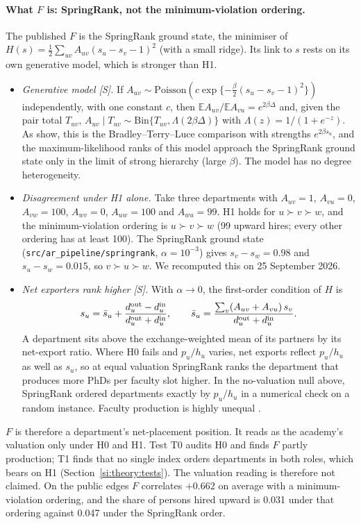 \documentclass[11pt]{article}
\begin{document}
\paragraph{What $F$ is: SpringRank, not the minimum-violation ordering.} The published $F$ is the SpringRank
ground state, the minimiser of $H(s)=\tfrac12\sum_{uv}A_{uv}(s_u-s_v-1)^2$ (with a small ridge). Its link to $s$
rests on its own generative model, which is stronger than H1.
\begin{itemize}
\item \emph{Generative model [S].} If $A_{uv}\sim\mathrm{Poisson}(c\exp\{-\tfrac{\beta}{2}(s_u-s_v-1)^2\})$
independently, with one constant $c$, then $\mathbb E A_{uv}/\mathbb E A_{vu}=e^{2\beta\Delta}$ and, given the
pair total $T_{uv}$, $A_{uv}\mid T_{uv}\sim\mathrm{Bin}\{T_{uv},\Lambda(2\beta\Delta)\}$ with
$\Lambda(z)=1/(1+e^{-z})$. As \citet{debacco2018physical} show, this is the Bradley--Terry--Luce comparison
\citep{bradley1952rank} with strengths $e^{2\beta s_u}$, and the maximum-likelihood ranks of this model approach
the SpringRank ground state only in the limit of strong hierarchy (large $\beta$). The model has no degree
heterogeneity.
\item \emph{Disagreement under H1 alone.} Take three departments with $A_{uv}=1$, $A_{vu}=0$, $A_{vw}=100$,
$A_{wv}=0$, $A_{uw}=100$ and $A_{wu}=99$. H1 holds for $u\succ v\succ w$, and the minimum-violation ordering is
$u\succ v\succ w$ (99 upward hires; every other ordering has at least 100). The SpringRank ground state
(\texttt{src/ar\_pipeline/springrank}, $\alpha=10^{-3}$) gives $s_v-s_w=0.98$ and $s_u-s_w=0.015$, so $v\succ
u\succ w$. We recomputed this on 25 September 2026.
\item \emph{Net exporters rank higher [S].} With $\alpha\to0$, the first-order condition of $H$ is
\[
s_u=\bar s_u+\frac{d^{\rm out}_u-d^{\rm in}_u}{d^{\rm out}_u+d^{\rm in}_u},\qquad
\bar s_u=\frac{\sum_v(A_{uv}+A_{vu})\,s_v}{d^{\rm out}_u+d^{\rm in}_u}.
\]
A department sits above the exchange-weighted mean of its partners by its net-export ratio. Where H0 fails and
$p_u/h_u$ varies, net exports reflect $p_u/h_u$ as well as $s_u$, so at equal valuation SpringRank ranks the
department that produces more PhDs per faculty slot higher. In the no-valuation null above, SpringRank
ordered departments exactly by $p_u/h_u$ in a numerical check on a random instance. Faculty production is highly
unequal \citep{wapman2022quantifying}.
\end{itemize}
$F$ is therefore a department's net-placement position. It reads as the academy's valuation only under H0 and H1.
Test T0 audits H0 and finds $F$ partly production; T1 finds that no single index orders departments in both roles,
which bears on H1 (Section~\ref{si:theory:tests}). The valuation reading is therefore not claimed. On the public
edges $F$ correlates
$+0.662$ on average with a minimum-violation ordering, and the share of persons hired upward is 0.031 under that
ordering against 0.047 under the SpringRank order.
\end{document}
